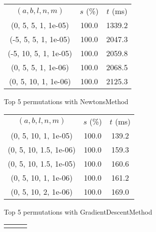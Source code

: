 \begin{figure}[H]
\label{fig:param_comp_NegativeEntropy_UniformSearch}
\begin{subfigure}[ht]{.5\textwidth}
\begin{tabular}{|c|c|c|}
\hline
\rowcolor{gray!25}
\multicolumn{3}{|c|}{NewtonsMethod} \\
\hline
\rowcolor{gray!25}
$(a,b,l,n,m)$ & $s$ (\%) & $t$ (ms) \\
\hline
(0, 5, 5, 1, 1e-05) & 100.0 & 1339.2 \\
(-5, 5, 5, 1, 1e-05) & 100.0 & 2047.3 \\
(-5, 10, 5, 1, 1e-05) & 100.0 & 2059.8 \\
(0, 5, 5, 1, 1e-06) & 100.0 & 2068.5 \\
(0, 5, 10, 1, 1e-06) & 100.0 & 2125.3 \\
\hline
\end{tabular}
\caption{Top 5 permutations with NewtonsMethod}
\label{subfig:param_comp_NegativeEntropy_NewtonsMethod_UniformSearch}
\end{subfigure}
\hfill
\begin{subfigure}[ht]{.5\textwidth}
\begin{tabular}{|c|c|c|}
\hline
\rowcolor{gray!25}
\multicolumn{3}{|c|}{GradientDescentMethod} \\
\hline
\rowcolor{gray!25}
$(a,b,l,n,m)$ & $s$ (\%) & $t$ (ms) \\
\hline
(0, 5, 10, 1, 1e-05) & 100.0 & 139.2 \\
(0, 5, 10, 1.5, 1e-06) & 100.0 & 159.3 \\
(0, 5, 10, 1.5, 1e-05) & 100.0 & 160.6 \\
(0, 5, 10, 1, 1e-06) & 100.0 & 161.2 \\
(0, 5, 10, 2, 1e-06) & 100.0 & 169.0 \\
\hline
\end{tabular}
\caption{Top 5 permutations with GradientDescentMethod}
\label{subfig:param_comp_NegativeEntropy_GradientDescentMethod_UniformSearch}
\end{subfigure}
\hfill
\begin{subfigure}[ht]{.5\textwidth}
\begin{tabular}{|c|c|c|}
\hline
\rowcolor{gray!25}
\multicolumn{3}{|c|}{ConjugateGradientMethod} \\

\end{tabular}
\end{subfigure}
\end{figure}
